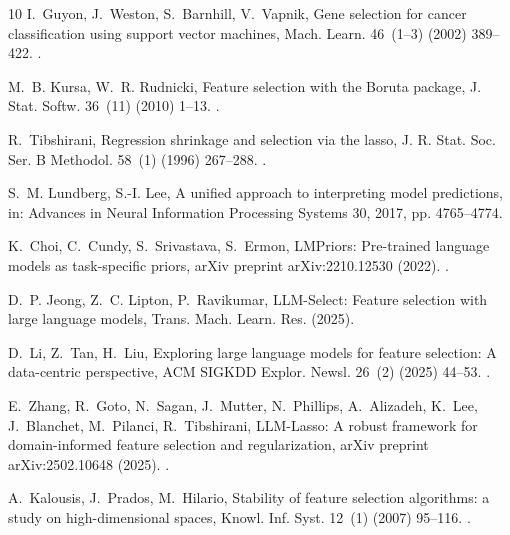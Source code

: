 \documentclass[final,5p,twocolumn]{elsarticle}
\begin{document}
\begin{thebibliography}{10}
I.~Guyon, J.~Weston, S.~Barnhill, V.~Vapnik, Gene selection for cancer
  classification using support vector machines, Mach. Learn. 46~(1--3)
  (2002) 389--422.
\newblock \href {https://doi.org/10.1023/A:1012487302797}
  {}.

M.~B. Kursa, W.~R. Rudnicki, Feature selection with the {B}oruta package,
  J. Stat. Softw. 36~(11) (2010) 1--13.
\newblock \href {https://doi.org/10.18637/jss.v036.i11}
  {}.

R.~Tibshirani, Regression shrinkage and selection via the lasso, J. R. Stat. Soc. Ser. B Methodol. 58~(1) (1996) 267--288.
\newblock \href {https://doi.org/10.1111/j.2517-6161.1996.tb02080.x}
  {}.

S.~M. Lundberg, S.-I. Lee, A unified approach to interpreting model
  predictions, in: Advances in Neural Information Processing Systems 30, 2017,
  pp. 4765--4774.

K.~Choi, C.~Cundy, S.~Srivastava, S.~Ermon, {LMPriors}: Pre-trained language
  models as task-specific priors, arXiv preprint arXiv:2210.12530 (2022).
\newblock \href {https://doi.org/10.48550/arXiv.2210.12530}
  {}.

D.~P. Jeong, Z.~C. Lipton, P.~Ravikumar, {LLM-Select}: Feature selection with
  large language models, Trans. Mach. Learn. Res. (2025).

D.~Li, Z.~Tan, H.~Liu, Exploring large language models for feature selection: A
  data-centric perspective, ACM SIGKDD Explor. Newsl. 26~(2) (2025)
  44--53.
\newblock \href {https://doi.org/10.1145/3715073.3715077}
  {}.

E.~Zhang, R.~Goto, N.~Sagan, J.~Mutter, N.~Phillips, A.~Alizadeh, K.~Lee,
  J.~Blanchet, M.~Pilanci, R.~Tibshirani, {LLM-Lasso}: A robust framework for
  domain-informed feature selection and regularization, arXiv preprint
  arXiv:2502.10648 (2025).
\newblock \href {https://doi.org/10.48550/arXiv.2502.10648}
  {}.

A.~Kalousis, J.~Prados, M.~Hilario, Stability of feature selection algorithms:
  a study on high-dimensional spaces, Knowl. Inf. Syst. 12~(1)
  (2007) 95--116.
\newblock \href {https://doi.org/10.1007/s10115-006-0040-8}
  {}.


\end{thebibliography}
\end{document}
